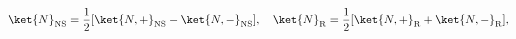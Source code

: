 \begin{equation}
 \ket{N}_{\rm NS} = \frac{1}{2} [ \ket{N,+}_{\rm NS} - \ket{N,-}_{\rm NS}  ]  
  , \quad
 \ket{N}_{\rm R} = \frac{1}{2} [ \ket{N,+}_{\rm R} + \ket{N,-}_{\rm R}  ] ,   
\end{equation}

